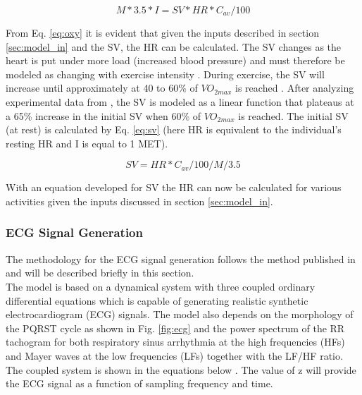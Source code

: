 \documentclass[paper=a4, fontsize=11pt]{scrartcl}
\numberwithin{equation}{section}		%
\numberwithin{figure}{section}			%
\numberwithin{table}{section}		    %
\begin{document}
 \begin{equation}\label{eq:oxy}
 M*3.5*I=SV*HR*C_{av}/100
 \end{equation} 

From Eq. \ref{eq:oxy} it is evident that given the inputs described in section \ref{sec:model_in}
and the SV, the HR can be calculated. The SV changes as the heart is put under more load (increased
blood pressure) and must therefore be modeled as changing with exercise intensity 
\cite{hotehama2003simulation}. During exercise, the SV will increase until approximately at 40 to 
60\% of $VO_{2max}$ is reached \cite{united1996physical}. After analyzing experimental data from 
\cite{united1996physical}, the SV is modeled as a linear function that plateaus at a 65\% 
increase in the initial SV when 60\% of $VO_{2max}$ is reached. The initial SV (at rest) 
is calculated by Eq. \ref{eq:sv} (here HR is equivalent to the individual's resting HR and I is
equal to 1 MET).

\begin{equation}\label{eq:sv}
SV = HR*C_{av}/100/M/3.5
\end{equation}

With an equation developed for SV the HR can now be calculated for various activities given the 
inputs discussed in section \ref{sec:model_in}.

\subsubsection{ECG Signal Generation}\label{sec:model_cont_ecg}
The methodology for the ECG signal generation follows the method published in 
\cite{mcsharry2003dynamical} and will be described briefly in this section. \\

The model is based on a dynamical system with three coupled ordinary differential equations 
which is capable of generating realistic synthetic electrocardiogram (ECG) signals. The model 
also depends on the morphology of the PQRST cycle as shown in Fig. \ref{fig:ecg} and the power 
spectrum of the RR tachogram for both respiratory sinus arrhythmia at the high frequencies (HFs)
and Mayer waves at the low frequencies (LFs) together with the LF/HF ratio.\\

The coupled system is shown in the equations below \cite{mcsharry2003dynamical}. The value of 
z will provide the ECG signal as a function of sampling frequency and time.
\end{document}
